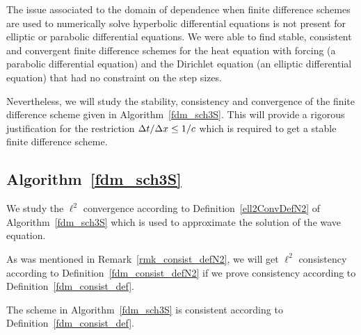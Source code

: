 The issue associated to the domain of dependence when finite
difference schemes are used to numerically solve hyperbolic 
differential equations is not present for elliptic or parabolic
differential equations.  We were able to find stable, consistent and
convergent finite difference schemes for the heat equation with
forcing (a parabolic differential equation) and the Dirichlet equation
(an elliptic differential equation) that had no constraint on
the step sizes.

Nevertheless, we will study the stability, consistency and convergence
of the finite difference scheme given in Algorithm~\ref{fdm_sch3S}.
This will provide a rigorous justification for the restriction
$\Delta{t}/\Delta{x} \leq 1/c$ which is required to get a stable finite
difference scheme.

\subsection{Algorithm~\ref{fdm_sch3S}}

We study the $\ell^2$ convergence according to
Definition~\ref{ell2ConvDefN2} of Algorithm~\ref{fdm_sch3S} which is
used to approximate the solution of the wave equation.

As was mentioned in Remark~\ref{rmk_consist_defN2}, we will get
$\ell^2$ consistency according to Definition~\ref{fdm_consist_defN2}
if we prove consistency according to Definition~\ref{fdm_consist_def}.

\begin{prop}
The scheme in Algorithm~\ref{fdm_sch3S} is consistent according to
Definition~\ref{fdm_consist_def}.
\end{prop}

